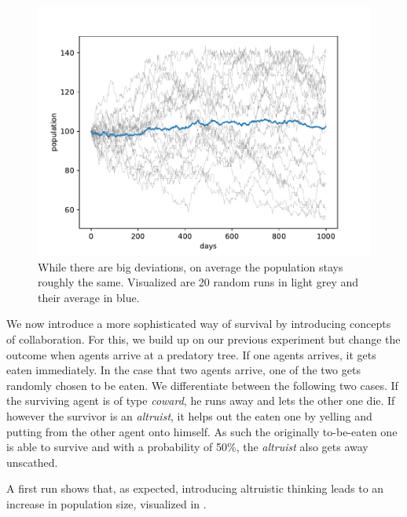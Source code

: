 \documentclass[sigconf]{acmart}
\newcommand{\todo}[1]{{\color{red}{#1}}}
\newcommand{\VNumSimulations}{20\xspace}
\newcommand{\coward}{\textit{coward}\xspace}
\newcommand{\altruist}{\textit{altruist}\xspace}
\begin{document}
    \begin{figure}
        \includegraphics[width=\columnwidth]{figures/stable_population}
        \caption{While there are big deviations, on average the population stays roughly the same.
        Visualized are \VNumSimulations random runs in light grey and their average in blue. }
        \label{fig:stable_pop}
    \end{figure}

    We now introduce a more sophisticated way of survival by introducing concepts of collaboration.
    For this, we build up on our previous experiment but change the outcome when agents arrive at a predatory tree.
    If one agents arrives, it gets eaten immediately.
    In the case that two agents arrive, one of the two gets randomly chosen to be eaten.
    We differentiate between the following two cases.
    If the surviving agent is of type \coward, he runs away and lets the other one die.
    If however the survivor is an \altruist, it helps out the eaten one by yelling and putting from the other agent onto himself.
    As such the originally to-be-eaten one is able to survive and with a probability of 50\%, the \altruist also gets away unscathed.

    \todo{add code with logic}

    A first run shows that, as expected, introducing altruistic thinking leads to an increase in population size, visualized in .
\end{document}
